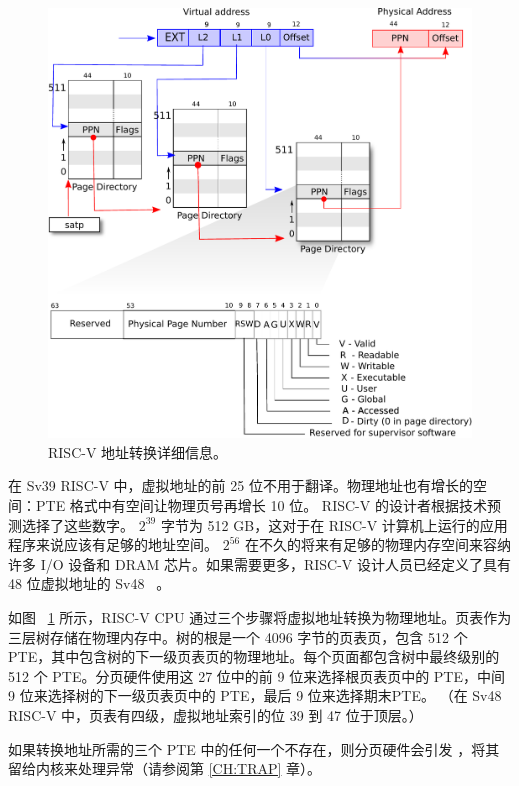 \documentclass[UTF8]{article}
\begin{document}
   \begin{figure}[t]
\center
\includegraphics[scale=0.5]{fig/riscv_pagetable.pdf}
\caption{RISC-V 地址转换详细信息。  }
\label{fig:riscv_pagetable}
\end{figure}     

在 Sv39 RISC-V 中，虚拟地址的前 25 位不用于翻译。物理地址也有增长的空间：PTE 格式中有空间让物理页号再增长 10 位。 RISC-V 的设计者根据技术预测选择了这些数字。    $2^{39}$    字节为 512 GB，这对于在 RISC-V 计算机上运行的应用程序来说应该有足够的地址空间。    $2^{56}$    在不久的将来有足够的物理内存空间来容纳许多 I/O 设备和 DRAM 芯片。如果需要更多，RISC-V 设计人员已经定义了具有 48 位虚拟地址的 Sv48~    \cite{riscv:priv}    。  

如图~    \ref{fig:riscv_pagetable}    所示，RISC-V CPU 通过三个步骤将虚拟地址转换为物理地址。页表作为三层树存储在物理内存中。树的根是一个 4096 字节的页表页，包含 512 个 PTE，其中包含树的下一级页表页的物理地址。每个页面都包含树中最终级别的 512 个 PTE。分页硬件使用这 27 位中的前 9 位来选择根页表页中的 PTE，中间 9 位来选择树的下一级页表页中的 PTE，最后 9 位来选择期末PTE。 （在 Sv48 RISC-V 中，页表有四级，虚拟地址索引的位 39 到 47 位于顶层。）  

如果转换地址所需的三个 PTE 中的任何一个不存在，则分页硬件会引发        ，将其留给内核来处理异常（请参阅第    \ref{CH:TRAP}    章）。  
\end{document}
